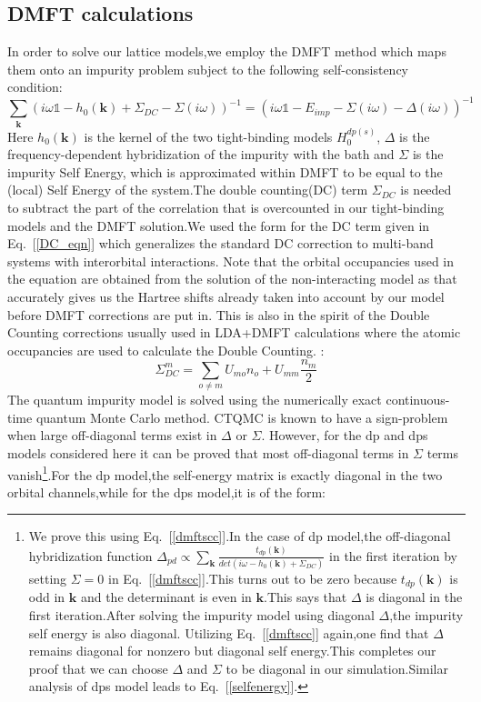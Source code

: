 \documentclass[10pt]{ruthesis}
\begin{document}
{\subsection{\label{DMFT}DMFT calculations}
In order to solve our lattice models,we employ the DMFT method which maps them onto an impurity problem subject to the following self-consistency condition\cite{RMP_DMFT_1996_A.G_G.K}:
\begin{equation}\label{dmftscc}
\sum_{\mathbf k}(i\omega\mathbb{1}-h_0(\mathbf k)+\Sigma_{DC}-\Sigma(i\omega))^{-1}=(i\omega\mathbb{1}-E_{imp}-\Sigma(i\omega)-\Delta(i\omega))^{-1}
\end{equation}
Here $h_0(\mathbf k)$ is the kernel of the two tight-binding models $H^{dp(s)}_0$, $\Delta$ is the frequency-dependent hybridization of the impurity with the bath and $\Sigma$ is the impurity Self Energy, which is approximated within DMFT to be equal to the (local) Self Energy of the system.The double counting(DC) term $\Sigma_{DC}$ is needed to subtract the part of the correlation that is overcounted  in our tight-binding models and the DMFT solution.We used the form for the DC term given in Eq.~[\ref{DC_eqn}] which generalizes the standard DC correction to multi-band systems with interorbital interactions\cite{JPCM_LDA+U_Doublecounting_1997_Anisimov}. Note that the orbital occupancies used in the equation are obtained from the solution of the non-interacting model as that accurately gives us the Hartree shifts already taken into account by our model before DMFT corrections are put in. This is also in the spirit of the Double Counting corrections usually used in LDA+DMFT calculations where the atomic occupancies are used to calculate the Double Counting. :
\begin{equation}\label{DC_eqn}
\Sigma^m_{DC}=\sum_{o\neq m}U_{mo}n_o+U_{mm}\frac{n_m}{2}
\end{equation}
The quantum impurity model is solved using the numerically exact continuous-time quantum Monte Carlo method\cite{PRL_firstpaper_on_CTQMC_2006_P.Werner_A.J,PRB_CTQMC_2007_K.Haule}. CTQMC is known to have a sign-problem when large off-diagonal terms exist in $\Delta$ or $\Sigma$. However, for the dp and dps models considered here it can be proved that most off-diagonal terms in $\Sigma$ terms vanish\footnote{We prove this using Eq.~[\ref{dmftscc}].In the case of dp model,the off-diagonal hybridization function $\Delta_{pd}\propto\sum_{\mathbf k} \frac{t_{dp}(\mathbf k)}{det(i\omega-h_0(\mathbf k)+\Sigma_{DC})} $ in the first iteration by setting $\Sigma=0$ in Eq.~[\ref{dmftscc}].This turns out to be zero because $t_{dp}(\mathbf k)$ is odd in $\mathbf k$ and the determinant is even in $\mathbf k$.This says that $\Delta$ is diagonal in the first iteration.After solving the impurity model using diagonal $\Delta$,the impurity self energy is also diagonal. Utilizing Eq.~[\ref{dmftscc}] again,one find that $\Delta$ remains diagonal for nonzero but diagonal self energy.This completes our proof that we can choose $\Delta$ and $\Sigma$ to be diagonal in our simulation.Similar analysis of dps model leads to Eq.~[\ref{selfenergy}].}.For the dp model,the self-energy matrix is exactly diagonal in the two orbital channels,while for the dps model,it is of the form:
}
\end{document}
